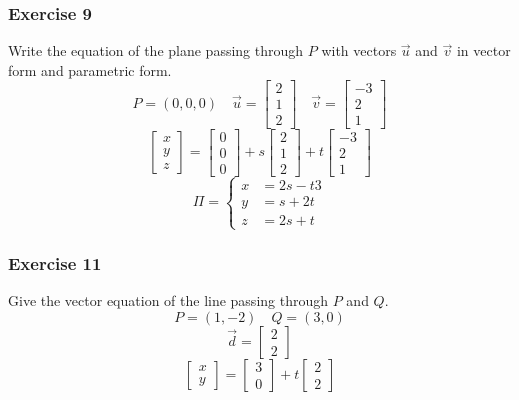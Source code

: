 \documentclass[letterpaper, 12pt]{math}
\begin{document}
\subsubsection*{Exercise 9}
Write the equation of the plane passing through \( P \) with vectors \( \vec{u}
\) and \( \vec{v} \) in vector form and parametric form.
\[ P = (0,0,0) \quad \vec{u} = \begin{bmatrix}2 \\ 1 \\ 2\end{bmatrix} \quad
  \vec{v} = \begin{bmatrix}-3 \\ 2 \\ 1\end{bmatrix} \]
\[ \begin{bmatrix}x \\ y \\ z\end{bmatrix} =
  \begin{bmatrix}0 \\ 0 \\ 0\end{bmatrix}+
  s\begin{bmatrix}2 \\ 1 \\ 2\end{bmatrix}+
  t\begin{bmatrix}-3 \\ 2 \\ 1\end{bmatrix} \]
\[ \Pi = \begin{cases}
  x &= 2s-t3 \\
  y &= s+2t \\
  z &= 2s+t
\end{cases} \]

\subsubsection*{Exercise 11}
Give the vector equation of the line passing through \( P \) and \( Q \).
\[ P = (1,-2) \quad Q = (3,0) \]
\[ \vec{d} = \begin{bmatrix}2 \\ 2\end{bmatrix} \]
\[ \begin{bmatrix}x \\ y\end{bmatrix} = \begin{bmatrix}3 \\ 0\end{bmatrix}+
  t\begin{bmatrix}2 \\ 2\end{bmatrix} \]
\end{document}

